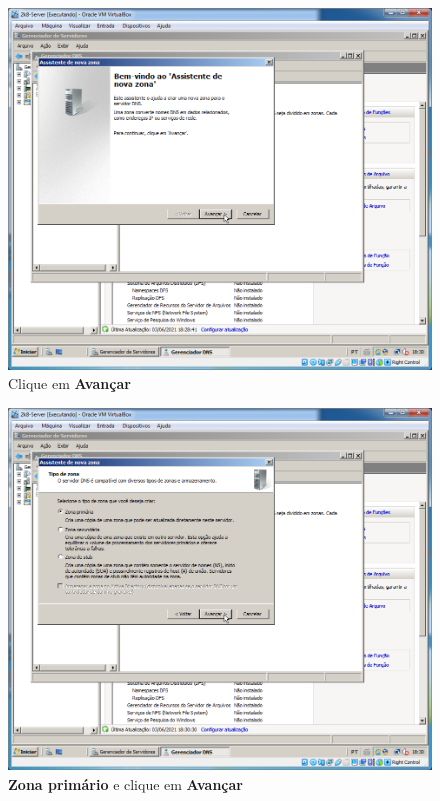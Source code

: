 \documentclass[10pt]{article}
\begin{document}
\begin{figure}[H]
    \centering
    \caption{Clique em \textbf{Avançar}}
    \label{fig:DNS014}
    \includegraphics[width=\linewidth]{images/windows_server/dns/014.png}
\end{figure}
\begin{figure}[H]
    \centering
    \caption{\textbf{Zona primário} e clique em \textbf{Avançar}}
    \label{fig:DNS015}
    \includegraphics[width=\linewidth]{images/windows_server/dns/015.png}
\end{figure}
\end{document}
